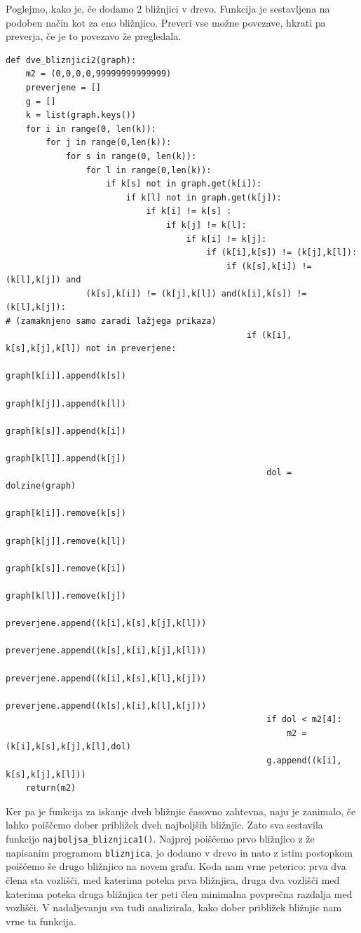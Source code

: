 \documentclass[a4paper,10pt]{article}
\begin{document}
Poglejmo, kako je, če dodamo 2 bližnjici v drevo. Funkcija je sestavljena na podoben način kot za eno bližnjico. Preveri vse možne povezave, hkrati pa preverja, če je to povezavo že pregledala. 
\small
\begin{verbatim}
def dve_bliznjici2(graph):
    m2 = (0,0,0,0,99999999999999)
    preverjene = []
    g = []
    k = list(graph.keys())
    for i in range(0, len(k)):
        for j in range(0,len(k)):
            for s in range(0, len(k)):
                for l in range(0,len(k)):
                    if k[s] not in graph.get(k[i]):
                        if k[l] not in graph.get(k[j]):
                            if k[i] != k[s] :
                                if k[j] != k[l]:
                                    if k[i] != k[j]:
                                        if (k[i],k[s]) != (k[j],k[l]):
                                            if (k[s],k[i]) != (k[l],k[j]) and 
				(k[s],k[i]) != (k[j],k[l]) and(k[i],k[s]) != (k[l],k[j]):
# (zamaknjeno samo zaradi lažjega prikaza)
                                                if (k[i], k[s],k[j],k[l]) not in preverjene:
                                                    graph[k[i]].append(k[s])
                                                    graph[k[j]].append(k[l])
                                                    graph[k[s]].append(k[i])
                                                    graph[k[l]].append(k[j])
                                                    dol = dolzine(graph)
                                                    graph[k[i]].remove(k[s])
                                                    graph[k[j]].remove(k[l])
                                                    graph[k[s]].remove(k[i])
                                                    graph[k[l]].remove(k[j])
                                                    preverjene.append((k[i],k[s],k[j],k[l]))
                                                    preverjene.append((k[s],k[i],k[j],k[l]))
                                                    preverjene.append((k[i],k[s],k[l],k[j]))
                                                    preverjene.append((k[s],k[i],k[l],k[j]))
                                                    if dol < m2[4]:
                                                        m2 = (k[i],k[s],k[j],k[l],dol)
                                                    g.append((k[i], k[s],k[j],k[l]))
    return(m2)
\end{verbatim}
\normalsize
Ker pa je funkcija za iskanje dveh bližnjic časovno zahtevna, naju je zanimalo, če lahko poiščemo dober približek dveh najboljših bližnjic. Zato sva sestavila funkcijo \texttt{najboljsa\_bliznjica1()}. Najprej poiščemo prvo bližnjico z že napisanim programom \texttt{bliznjica}, jo dodamo v drevo in nato z istim postopkom poiščemo še drugo bližnjico na novem grafu. Koda nam vrne peterico: prva dva člena sta vozlišči, med katerima poteka prva bližnjica, druga dva vozlišči med katerima poteka druga bližnjica ter peti člen minimalna povprečna razdalja med vozlišči. V nadaljevanju sva tudi analizirala, kako dober približek bližnjic nam vrne ta funkcija.
\end{document}

